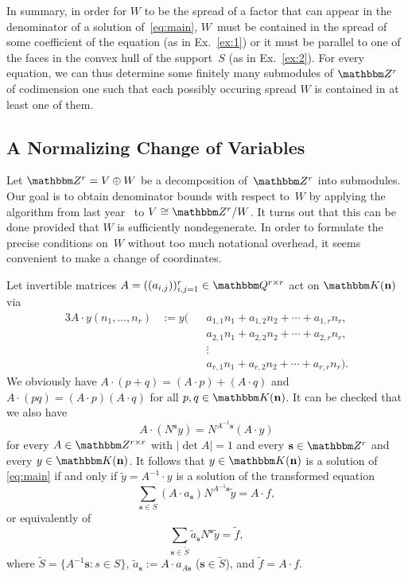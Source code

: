 \documentclass[a4paper]{sig-alternate}
\let\set\mathbbm
\def\vec#1{\mathbf{#1}}
\def\K{\set K}
\begin{document}
In summary, in order for $W$ to be the spread of a factor that can appear in the denominator
of a solution of~\eqref{eq:main}, $W$~must be contained in the spread of some coefficient
of the equation (as in Ex.~\ref{ex:1}) or it must be parallel to one of the faces in the
convex hull of the support~$S$ (as in Ex.~\ref{ex:2}).
For every equation, we can thus determine some finitely many submodules of $\set Z^r$ of
codimension one such that each possibly occuring spread $W$ is contained in at least one
of them.

\subsection{A Normalizing Change of Variables}\label{sec:normal}

Let $\set Z^r=V\oplus W$ be a decomposition of~$\set Z^r$ into submodules.
Our goal is to obtain denominator bounds with respect to~$W$ by applying the
algorithm from last year~\cite{kauers10b} to $V\cong\set Z^r/W$.
It turns out that this can be done provided
that $W$ is sufficiently nondegenerate. In order to formulate the precise
conditions on~$W$ without too much notational overhead, it seems convenient
to make a change of coordinates.

Let invertible matrices $A=((a_{i,j}))_{i,j=1}^r\in\set Q^{r\times r}$
act on $\K(\vec n)$ via
\begin{alignat*}3
  A\cdot y(n_1,\dots,n_r)
  &:= y\bigl(&&a_{1,1}n_1+a_{1,2}n_2+\cdots+a_{1,r}n_r,\\
  &          &&a_{2,1}n_1+a_{2,2}n_2+\cdots+a_{2,r}n_r,\\
  &          &&\vdots\\
  &          &&a_{r,1}n_1+a_{r,2}n_2+\cdots+a_{r,r}n_r\bigr).
\end{alignat*}
We obviously have $A\cdot(p+q)=(A\cdot p)+(A\cdot q)$ and
$A\cdot(pq)=(A\cdot p)(A\cdot q)$ for all $p,q\in\K(\vec n)$.
It can be checked that we also have
\[
  A\cdot(N^{\vec s}y)=N^{A^{-1}\vec s}(A\cdot y)
\]
for every $A\in\set Z^{r\times r}$ with $|\det A|=1$ and
every $\vec s\in\set Z^r$ and every $y\in\set K(\vec n)$.
It follows that $y\in\K(\vec n)$ is a solution of \eqref{eq:main}
if and only if $\tilde y=A^{-1}\cdot y$ is a solution of the transformed equation
\[
  \sum_{\vec s\in S}(A\cdot a_{\vec s})N^{A^{-1}\vec s}\tilde y=A\cdot f,
\]
or equivalently of
\[
  \sum_{\vec s\in\tilde S}\tilde a_{\vec s}N^{\vec s}\tilde y=\tilde f,
\]
where $\tilde S=\{A^{-1}\vec s:s\in S\}$, $\tilde a_{\vec s}:=A\cdot a_{A\vec s}$
($\vec s\in\tilde S$), and $\tilde f=A\cdot f$.
\end{document}
